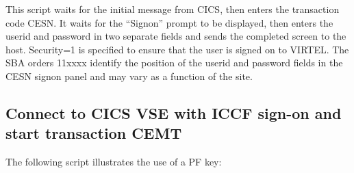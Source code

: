 \documentclass[letterpaper,10pt,english]{sphinxmanual}
\begin{document}

This script waits for the initial message from CICS, then enters the transaction code CESN. It waits for the “Signon” prompt to be displayed, then enters the userid and password in two separate fields and sends the completed screen to the host. Security=1 is specified to ensure that the user is signed on to VIRTEL. The SBA orders 11xxxx identify the position of the userid and password fields in the CESN signon panel and may vary as a function of the site.


\subsection{Connect to CICS VSE with ICCF sign-on and start transaction CEMT}
\label{\detokenize{connectivity_guide:index-125}}\label{\detokenize{connectivity_guide:connect-to-cics-vse-with-iccf-sign-on-and-start-transaction-cemt}}
The following script illustrates the use of a PF key:
\end{document}
